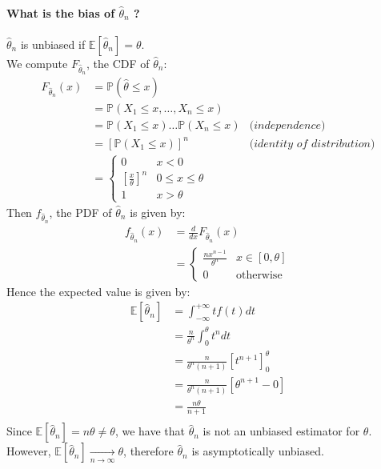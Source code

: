 \documentclass{article}
\newcommand{\E}{\mathbb{E}}
\renewcommand{\P}{\mathbb{P}}
\newcommand{\thetahat}{\hat\theta}
\begin{document}
\paragraph{What is the bias of \(\hat\theta_n\) ?\\}
\(\hat\theta_n\) is unbiased if \(\E[\hat\theta_n] = \theta\). \\
We compute \(F_{\thetahat_n}\), the CDF of \(\hat\theta_n\):
\begin{align*}
    F_{\thetahat_n}(x)
     & = \P(\thetahat \leq x)                                                       \\
     & = \P(X_1 \leq x, \ldots, X_n \leq x)                                         \\
     & = \P(X_1 \leq x) \ldots \P(X_n \leq x) & \textit{(independence)}             \\
     & = \left[\P(X_1 \leq x)\right]^n        & \textit{(identity of distribution)} \\
     & = \begin{cases}
        0                                 & x < 0                \\
        \left[ \frac{x}{\theta} \right]^n & 0 \leq x \leq \theta \\
        1                                 & x > \theta
    \end{cases}
\end{align*}
Then \(f_{\thetahat_n}\), the PDF of \(\thetahat_n\) is given by:
\begin{align*}
    f_{\thetahat_n}(x)
     & = \frac{d}{dx} F_{\thetahat_n}(x) \\
     & =
    \begin{cases}
        \frac{n x^{n-1}}{\theta^n} & x \in [0, \theta] \\
        0                          & \text{otherwise}
    \end{cases}
\end{align*}
Hence the expected value is given by:
\begin{align*}
    \E[\hat\theta_n]
     & = \int_{-\infty}^{+\infty} t f(t) dt                         \\
     & = \frac{n}{\theta^n} \int_{0}^{\theta} t^n dt                \\
     & = \frac{n}{\theta^n (n+1)} \left[t^{n+1}\right]_{0}^{\theta} \\
     & = \frac{n}{\theta^n (n+1)} \left[ \theta^{n+1} - 0 \right]   \\
     & = \frac{n \theta}{n+1}                                       \\
\end{align*}
Since \(\E[\hat\theta_n] = n \theta \neq \theta\), we have that \(\thetahat_n\) is not an unbiased estimator for \(\theta\). However, \(\E[\thetahat_n] \xrightarrow[n \to \infty]{} \theta\), therefore \(\thetahat_n\) is asymptotically unbiased.
\end{document}
